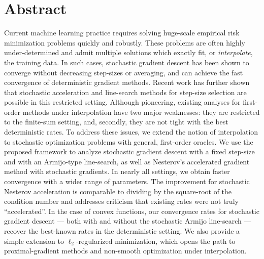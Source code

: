 
\chapter{Abstract}

Current machine learning practice requires solving huge-scale empirical risk minimization problems quickly and robustly. 
These problems are often highly under-determined and admit multiple solutions which exactly fit, or \emph{interpolate}, the training data. 
In such cases, stochastic gradient descent has been shown to converge without decreasing step-sizes or averaging, and can achieve the fast convergence of deterministic gradient methods. 
Recent work has further shown that stochastic acceleration and line-search methods for step-size selection are possible in this restricted setting.
Although pioneering, existing analyses for first-order methods under interpolation have two major weaknesses:
they are restricted to the finite-sum setting, and, secondly, they are not tight with the best deterministic rates. 
To address these issues, we extend the notion of interpolation to stochastic optimization problems with general, first-order oracles.
We use the proposed framework to analyze stochastic gradient descent with a fixed step-size and with an Armijo-type line-search, as well as Nesterov's accelerated gradient method with stochastic gradients.
In nearly all settings, we obtain faster convergence with a wider range of parameters. 
The improvement for stochastic Nesterov acceleration is comparable to dividing by the square-root of the condition number and addresses criticism that existing rates were not truly ``accelerated''. 
In the case of convex functions, our convergence rates for stochastic gradient descent --- both with and without the stochastic Armijo line-search --- recover the best-known rates in the deterministic setting.
We also provide a simple extension to \( \ell_2 \)-regularized minimization, which opens the path to proximal-gradient methods and non-smooth optimization under interpolation. 



